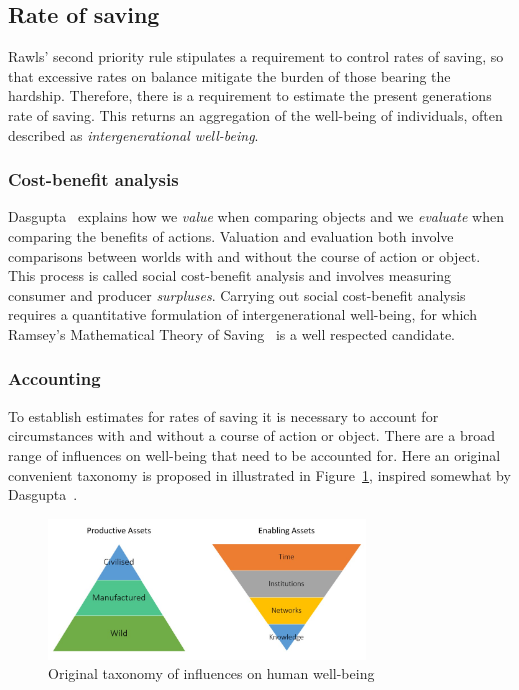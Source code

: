 \documentclass[11pt, oneside]{article}   	%
\begin{document}
\subsection{Rate of saving}

Rawls' second priority rule stipulates a requirement to control rates of saving, so that excessive rates on balance mitigate the burden of those bearing the hardship. Therefore, there is a requirement to estimate the present generations rate of saving. This returns an aggregation of the well-being of individuals, often described as \emph{intergenerational well-being}.

\subsubsection{Cost-benefit analysis}

Dasgupta~\cite{pd2} explains how we \emph{value} when comparing objects and we \emph{evaluate} when comparing the benefits of actions.
Valuation and evaluation both involve comparisons between worlds with and without the course of action or object.
This process is called social cost-benefit analysis and involves measuring consumer and producer \emph{surpluses}.
Carrying out social cost-benefit analysis requires a quantitative formulation of intergenerational well-being, for which Ramsey's Mathematical Theory of Saving~\cite{fr1} is a well respected candidate.

\subsubsection{Accounting}

To establish estimates for rates of saving it is necessary to account for circumstances with and without a course of action or object. There are a broad range of influences on well-being that need to be accounted for. Here an original convenient taxonomy is proposed in illustrated in Figure~\ref{Influences on well-being figure}, inspired somewhat by Dasgupta~\cite{pd3}.

\begin{figure}[H]
\begin{center}
\includegraphics[width=0.75\textwidth]{productiveAssetTaxonomy.png}
\caption{Original taxonomy of influences on human well-being}
\label{Influences on well-being figure}
\end{center}
\end{figure}
\end{document}
